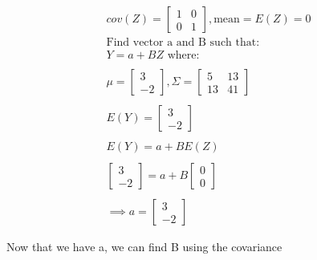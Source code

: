 \documentclass[oneside, a4paper]{article}
\begin{document}
\begin{equation}
    \begin{split}
        cov(Z) = \begin{bmatrix}
            1 & 0\\
            0 & 1
        \end{bmatrix}, \text{mean} = E(Z) = 0 \\
        \text{Find vector a and B such that:} \\
        Y = a + BZ \text{ where:} \\ \\
        \mu =  \begin{bmatrix}
            3 \\
            -2
        \end{bmatrix}, \Sigma =  \begin{bmatrix}
            5 & 13 \\
            13 & 41
        \end{bmatrix} \\ \\
        E(Y) =  \begin{bmatrix}
            3 \\
            -2 
        \end{bmatrix} \\ \\ 
        E(Y) = a + BE(Z) \\ \\
        \begin{bmatrix}
            3 \\
            -2 
        \end{bmatrix} = a + B \begin{bmatrix}
            0 \\
            0 
        \end{bmatrix} \\ \\ 
        \implies a = \begin{bmatrix}
            3 \\
            -2 
        \end{bmatrix}
    \end{split}
\end{equation}

Now that we have a, we can find B using the covariance
\end{document}

